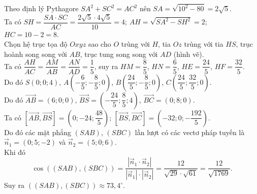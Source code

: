 \begin{ex}
{		Theo định lý Pythagore $SA^2 +SC^2= AC^2$ nên $SA= \sqrt{10^2-80} = 2\sqrt{5}$. \\
		Ta có $SH=\dfrac{SA \cdot SC}{AC} = \dfrac{2\sqrt{5} \cdot 4\sqrt{5}}{10} = 4$; $AH=\sqrt{SA^2-SH^2}=2$; $HC=10-2=8$. \\
		Chọn hệ trục tọa độ $Oxyz$ sao cho $O$ trùng với $H$, tia $Oz$ trùng với tia $HS$, trục hoành song song với $AB$, trục tung song song với $AD$ (hình vẽ).  \\
		Ta có $\dfrac{AH}{AC} = \dfrac{AM}{AB}= \dfrac{AN}{AD}= \dfrac{1}{5}$, suy ra $HM=\dfrac{8}{5}$, $HN= \dfrac{6}{5}$, $HE= \dfrac{24}{5}$, $HF= \dfrac{32}{5}$. \\
		Do đó $S(0;0;4)$, $A\left (-\dfrac{6}{5};-\dfrac{8}{5};0\right )$, $B\left (\dfrac{24}{5};-\dfrac{8}{5};0\right )$, $C\left (\dfrac{24}{5};\dfrac{32}{5};0\right )$. \\
		Do đó $\overrightarrow{AB}= (6;0;0)$, $\overrightarrow{BS} = \left (-\dfrac{24}{5};\dfrac{8}{5};4\right )$, $\overrightarrow{BC} = (0;8;0)$. 
		\\
		Ta có  $\left [\overrightarrow{AB}, \overrightarrow{BS} \right ] = \left (0;-24;\dfrac{48}{5}\right )$;  $\left [\overrightarrow{BS}, \overrightarrow{BC} \right ] = \left (-32;0;-\dfrac{192}{5}\right )$. \\
		Do đó các mặt phẳng $(SAB)$, $(SBC)$ lần lượt có các vectơ pháp tuyến là $\overrightarrow{n}_1= (0;5;-2)$ và $\overrightarrow{n}_2 = (5;0;6)$. \\
		Khi đó
		\[
		\cos ((SAB),(SBC)) = \dfrac{|\overrightarrow{n}_1 \cdot \overrightarrow{n}_2|}{|\overrightarrow{n}_1 |\cdot |\overrightarrow{n}_2|} = 
		\dfrac{12}{\sqrt{29} \cdot \sqrt{61}} = \dfrac{12}{\sqrt{1769}}.
		\]
		Suy ra $((SAB),(SBC)) \approx 73{,}4^\circ$.
	}
\end{ex}
